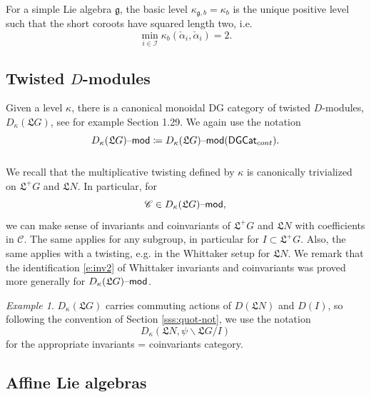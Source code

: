 \documentclass[11pt,reqno]{amsart}
\newcommand{\fL}{\mathfrak{L}}
\newcommand{\halpha}{\check{\alpha}}
\newcommand{\fg}{\mathfrak{g}}
\theoremstyle{remark}
\newtheorem{example}[subsubsection]{Example}
\numberwithin{equation}{section}
\newcommand{\cC}{\mathscr{C}}
\renewcommand{\mod}{\text{\textendash}\mathsf{mod}}
\newcommand{\DGCat}{\mathsf{DGCat}}
\begin{document}
\subsubsection{}
For a simple Lie algebra $\mathfrak{g}$, the
basic level $\kappa_{\fg,b} = \kappa_b$ 
is the unique positive level such that the short coroots have squared length 
two, i.e. \[\min_{i \in \mathscr{I}} \kappa_b(\halpha_i,\halpha_i) = 2. \]

\subsection{Twisted $D$-modules} 

Given a level $\kappa$, there is a canonical 
monoidal DG category of 
twisted $D$-modules, $D_\kappa(\fL G)$, see for example
\cite{whit} Section 1.29. We again use the notation
%
\[ 
D_\kappa(\fL G)\mod \coloneqq D_\kappa(\fL G)\mod(\DGCat_{cont}).
\]
%

\subsubsection{} We recall that the multiplicative twisting defined by $\kappa$ 
is 
canonically trivialized on $\fL^+ G$ and 
$\fL N$. In particular, for \begin{equation} \label{e:object}\cC \in 
D_\kappa(\fL G)\mod,\end{equation}
we can make sense of invariants and coinvariants of
$\fL^+ G$ and $\fL N$ with coefficients in $\cC$.
The same applies for any subgroup, in particular for
$I \subset \fL^+ G$. Also, the same applies with a twisting,
e.g. in the Whittaker setup for $\fL N$. We remark that the identification 
\eqref{e:inv2}
of Whittaker invariants and
coinvariants \cite{whit} was proved more generally
for $D_{\kappa}(\fL G)\mod$.

\begin{example}

$D_\kappa(\fL G)$ carries commuting actions of 
$D(\fL N)$ and $D(I)$, so following the convention of
Section \ref{sss:quot-not}, we use the notation
%
\[
D_\kappa(\fL N, \psi \backslash \fL G / I) 
\]
%
\noindent for the appropriate invariants = coinvariants
category.

\end{example}

\subsection{Affine Lie algebras} 
\end{document}
